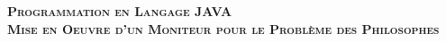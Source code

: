    \begin{titlepage}
    \centering
    \vspace*{\fill}

    \vspace*{0.5cm}
    \huge\bfseries
    \textsc{Programmation en Langage JAVA\\Mise en Oeuvre d'un Moniteur pour le Problème des Philosophes\\}
    \vspace*{0.5cm}
    
    \vspace*{\fill}
    \end{titlepage}
